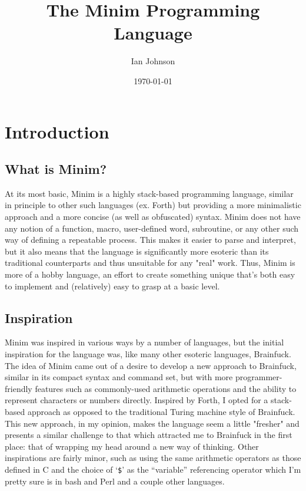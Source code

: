 \documentclass{article}
\begin{document}
\title{The Minim Programming Language}
\author{Ian Johnson}
\date{\today}
\maketitle

\tableofcontents

\section{Introduction}
\subsection{What is Minim?}
At its most basic, Minim is a highly stack-based programming language, similar in principle to other such languages (ex. Forth) but providing a more minimalistic approach and a more concise (as well as obfuscated) syntax. Minim does not have any notion of a function, macro, user-defined word, subroutine, or any other such way of defining a repeatable process. This makes it easier to parse and interpret, but it also means that the language is significantly more esoteric than its traditional counterparts and thus unsuitable for any "real" work. Thus, Minim is more of a hobby language, an effort to create something unique that's both easy to implement and (relatively) easy to grasp at a basic level.
\subsection{Inspiration}
Minim was inspired in various ways by a number of languages, but the initial inspiration for the language was, like many other esoteric languages, Brainfuck. The idea of Minim came out of a desire to develop a new approach to Brainfuck, similar in its compact syntax and command set, but with more programmer-friendly features such as commonly-used arithmetic operations and the ability to represent characters or numbers directly. Inspired by Forth, I opted for a stack-based approach as opposed to the traditional Turing machine style of Brainfuck. This new approach, in my opinion, makes the language seem a little "fresher" and presents a similar challenge to that which attracted me to Brainfuck in the first place: that of wrapping my head around a new way of thinking. Other inspirations are fairly minor, such as using the same arithmetic operators as those defined in C and the choice of `\texttt{\$}' as the ``variable'' referencing operator which I'm pretty sure is in bash and Perl and a couple other languages.
\end{document}
